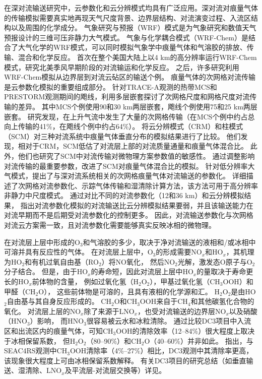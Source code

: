 在深对流输送研究中，云参数化和云分辨模式均具有广泛应用。深对流对痕量气体的传输模拟需要真实地再现天气尺度背景、边界层结构、对流演变过程、入流区结构以及周围的化学成分。 气象研究与预报（WRF）模式是为气象研究和数值天气预报设计的三维可压非静力大气模式。
气象与化学耦合模式（WRF-Chem）是结合了大气化学的WRF模式，可以同时模拟气象学中痕量气体和气溶胶的排放、传输、混合和化学反应\citep{Fast.2006,Grell.2005}。
\citet{Barth.2012}首次在整个美国大陆上以4 km的高分辨率运行WRF-Chem模式，研究北美季风早期阶段的对流输运和化学反应。
之后，许多研究利用WRF-Chem模拟从边界层到对流云砧区的输送个例\citep{Bela.2016,Li.2017b,Li.2018}。
痕量气体的次网格对流传输是云参数化模拟的重要组成部分。
\citet{Wang.1996}针对TRACE-A观测的热带MCS和PRESTORM观测期间的飑线，利用多层嵌套探讨了次网格尺度和网格尺度对流传输的差异。
其中MCS个例使用90和30 km两层嵌套，飑线个例使用75和25 km两层嵌套。
研究发现，在上升气流中发生了大量的次网格传输（在MCS个例中约占总向上传输的41\%，在飑线个例中约占64\%）。
\citet{Ott.2009}将云分辨模式（CRM）和柱模式（SCM）对三种对流系统中痕量气体垂直分布的模拟结果进行了比较。
他们发现，相对于CRM，SCM低估了对流层上部的对流质量通量和痕量气体混合比。
此外，他们也研究了SCM中对流传输对微物理方案参数值的敏感性。
通过调整影响对流传输的最重要参数，改进了SCM对痕量气体混合比的模拟。
\citet{Freitas.2000}针对低分辨率大气模式，提出了与深对流系统相关的次网格痕量气体对流输送的参数化。
\citet{Grell.2014}详细描述了次网格对流参数化、示踪气体传输和湿清除计算方法，该方法可用于高分辨率非静力中尺度模式。
\citet{Li.2018}通过对比不同的对流参数化（12和36 km）和云分辨模拟结果，
指出对流参数化模拟的对流输送比云分辨模拟结果要弱，并且该输送能力在对流早期而不是后期受对流参数化的控制更多。
因此，对流输送参数化与次网格对流云方案需一致，且对流参数化需要能够真实反映冰相的微物理。

在对流层上层中形成的O$_3$和气溶胶的多少，取决于净对流输送的液相和/或冰相中可溶并具有反应性的气体。
在对流层上层中，O$_3$的形成需要NO$_x$和HO$_x$，其机理为HO$_2$和有机过氧自由基（RO$_2$）将NO氧化，
然后NO$_2$光解，激发态O原子与O$_2$分子结合。
但是，由于HO$_x$的寿命短，因此对流层上层中HO$_x$的量取决于寿命更长的HO$_x$前体物的含量\citep{Chatfield.1984,Prather.1997}，
例如过氧化氢（H$_2$O$_2$），甲基过氧化氢（CH$_3$OOH）和甲醛（CH$_2$O），
这些前体物是可溶的，且具有液相的化学源和汇\citep{Barth.2007,Carlton.2007}。
H$_2$O$_2$是由HO$_2$自由基与其自身反应形成的。 CH$_2$O和CH$_3$OOH来自于CH$_4$和其他碳氢化合物的氧化。
对流层上层的NO$_x$除了来源于LNO$_x$，也受对流输送的边界层NO$_x$以及硝酸（HNO$_3$）影响\citep{Grassian.2005}，
而HNO$_3$很容易被云水和冰粒清除\citep{Neu.2012}。
通过比较DC3项目中入流区和出流区内的痕量气体，可知CH$_3$OOH的清除效率（12--84\%）很大程度上取决于冰相保留系数，
但H$_2$O$_2$（80--90\%）和CH$_2$O（40--60\%）并非如此\citep{Barth.2016,Bela.2016,Fried.2016}。
\citet{Cuchiara.2020}指出，与SEAC4RS观测中CH$_3$OOH清除率（4\%--27\%）相比，DC3观测中其清除率更高，该现象很大程度上可由冰相保留系数解释。
有关DC3项目的研究总结（如垂直输送、湿清除、LNO$_x$及平流层-对流层交换等）详见\citet{Barth.2019}。

